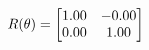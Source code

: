 \documentclass[preview]{standalone}
\begin{document}
\begin{align*}
\special{dvisvgm:raw <g id='unique000'>}R(\theta) = \begin{bmatrix}1.00 & -0.00\\0.00 & 1.00\end{bmatrix}\special{dvisvgm:raw </g>}
\end{align*}
\end{document}
